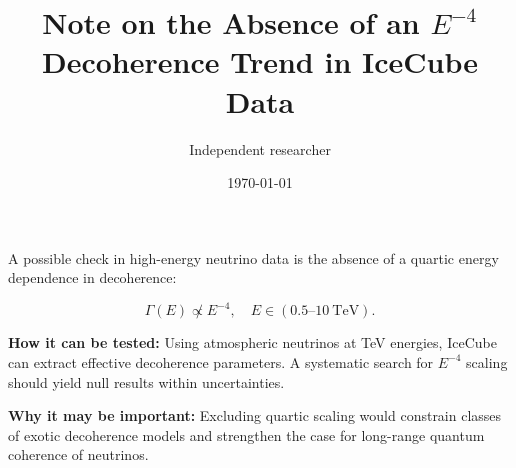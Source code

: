 \documentclass[12pt,a4paper]{article}
\title{Note on the Absence of an $E^{-4}$ Decoherence Trend in IceCube Data}
\author{Independent researcher}
\date{\today}
\begin{document}
\maketitle

\noindent
A possible check in high-energy neutrino data is the absence of a quartic energy dependence in decoherence:

\[
\Gamma(E) \not\propto E^{-4}, \quad E \in (0.5\text{–}10~\mathrm{TeV}).
\]

\textbf{How it can be tested:}  
Using atmospheric neutrinos at TeV energies, IceCube can extract effective decoherence parameters. A systematic search for $E^{-4}$ scaling should yield null results within uncertainties.

\textbf{Why it may be important:}  
Excluding quartic scaling would constrain classes of exotic decoherence models and strengthen the case for long-range quantum coherence of neutrinos.
\end{document}
